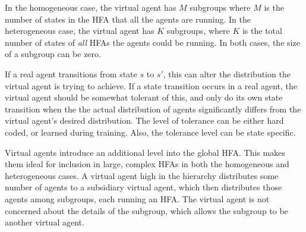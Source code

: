 \documentclass[11pt]{article}
\begin{document}
In the homogeneous case, the virtual agent has $M$ subgroups where $M$ is the number of states in the HFA that all the agents are running.  In the heterogeneous case, the virtual agent has $K$ subgroups, where $K$ is the total number of states of \textit{all} HFAs the agents could be running.  In both cases, the size of a subgroup can be zero.  

If a real agent transitions from state $s$ to $s'$, this can alter the distribution the virtual agent is trying to achieve.  If a state transition occurs in a real agent, the virtual agent should be somewhat tolerant of this, and only do its own state transition when the the actual distribution of agents significantly differs from the virtual agent's desired distribution.   The level of tolerance can be either hard coded, or learned during training.   Also, the tolerance level can be state specific.     

Virtual agents introduce an additional level into the global HFA.  This makes them ideal for inclusion in large, complex HFAs in both the homogeneous and heterogeneous cases.  A virtual agent high in the hierarchy distributes some number of agents to a subsidiary virtual agent, which then distributes those agents among subgroups, each running an HFA.  The virtual agent is not concerned about the details of the subgroup, which allows the subgroup to be another virtual agent.     
\end{document}
